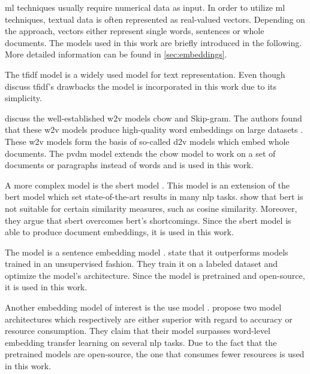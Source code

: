 \ac{ml} techniques usually require numerical data as input.
In order to utilize \ac{ml} techniques, textual data is often represented as real-valued vectors.
Depending on the approach, vectors either represent single words, sentences or whole documents.
The models used in this work are briefly introduced in the following.
More detailed information can be found in \autoref{sec:embeddings}.

The \acs*{tfidf} model is a widely used model for text representation.
Even though \citeauthor{tfidf2008} discuss \acs*{tfidf}'s drawbacks \cite{tfidf2008} the model is incorporated in this work due to its simplicity.

\citeauthor{WordRep2013} discuss the well-established \acs*{w2v} models \acs*{cbow} and Skip-gram.
The authors found that these \acs*{w2v} models produce high-quality word embeddings on large datasets \cite{WordRep2013}.
These \acs*{w2v} models form the basis of so-called \acs*{d2v} models which embed whole documents.
The \acs*{pvdm} model extends the \acs*{cbow} model to work on a set of documents or paragraphs instead of words \cite{gensim-doc2vec} and is used in this work.

A more complex model is the \acs*{sbert} model \cite{HfsentTrans2019}.
This model is an extension of the \acs*{bert} model which set state-of-the-art results in many \ac{nlp} tasks.
\citeauthor{HfsentTrans2019} show that \acs*{bert} is not suitable for certain similarity measures, such as cosine similarity.
Moreover, they argue that \acs*{sbert} overcomes \acs*{bert}'s shortcomings.
Since the \acs*{sbert} model is able to produce document embeddings, it is used in this work.

The \infersent{} model is a sentence embedding model \cite{inferSent2018}.
\citeauthor{inferSent2018} state that it outperforms models trained in an unsupervised fashion.
They train it on a labeled dataset and optimize the model's architecture.
Since the model is pretrained and open-source, it is used in this work.

Another embedding model of interest is the \acs*{use} model \cite{UniversalSentEnc2018}.
\citeauthor{UniversalSentEnc2018} propose two model architectures which respectively are either superior with regard to accuracy or resource consumption.
They claim that their model surpasses word-level embedding transfer learning on several \acs*{nlp} tasks.
Due to the fact that the pretrained models are open-source, the one that consumes fewer resources is used in this work.